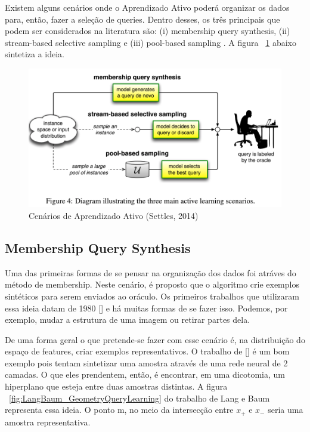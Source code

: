 Existem alguns cenários onde o Aprendizado Ativo poderá organizar os dados para, então, fazer a seleção de queries. Dentro desses, os três principais que podem ser considerados na literatura são: (i) membership query synthesis, (ii) stream-based selective sampling e (iii) pool-based sampling \cite{settles2014active}. A figura ~\ref{fig:ActiveLearningScenarios} abaixo sintetiza a ideia.


\begin{figure}
  \centering
  \includegraphics[width=.8\textwidth]{figures/active_learning_scenarios.png}
  \caption{Cenários de Aprendizado Ativo (Settles, 2014)}
  \label{fig:ActiveLearningScenarios}
\end{figure}


\subsection{Membership Query Synthesis}
\label{sec:cenarios_membeship}

Uma das primeiras formas de se pensar na organização dos dados foi atráves do método de membership. Neste cenário, é proposto que o algoritmo crie exemplos sintéticos para serem enviados ao oráculo. Os primeiros trabalhos que utilizaram essa ideia datam de 1980 [\cite{shapiro1981algorithm, shapiro1982algorithmic, shapiro198algorithmic_2}] e há muitas formas de se fazer isso. Podemos, por exemplo, mudar a estrutura de uma imagem ou retirar partes dela. 

De uma forma geral o que pretende-se fazer com esse cenário é, na distribuição do espaço de features, criar exemplos representativos. O trabalho de [\cite{baum1992query}] é um bom exemplo pois tentam sintetizar uma amostra através de uma rede neural de 2 camadas. O que eles prendentem, então, é encontrar, em uma dicotomia, um hiperplano que esteja entre duas amostras distintas. A figura ~\ref{fig:LangBaum_GeometryQueryLearning} do trabalho de Lang e Baum representa essa ideia. O ponto m, no meio da intersecção entre $x_+$ e $x_-$ seria uma amostra representativa.

